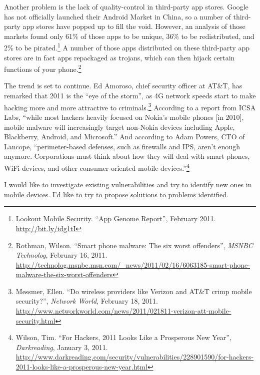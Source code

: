 \documentclass[11pt]{article}
\begin{document}
Another problem is the lack of quality-control in third-party app stores. Google has not officially launched their Android Market in China, so a number of third-party app stores have popped up to fill the void. However, an analysis of those markets found only 61\% of those apps to be unique, 36\% to be redistributed, and 2\% to be pirated.\footnote{Lookout Mobile Security. ``App Genome Report'', February 2011. \url{http://bit.ly/idg1tI}} A number of those apps distributed on these third-party app stores are in fact apps repackaged as trojans, which can then hijack certain functions of your phone.\footnote{Rothman, Wilson. ``Smart phone malware: The six worst offenders'', \textit{MSNBC Technolog}, 
February 16, 2011. \url{http://technolog.msnbc.msn.com/_news/2011/02/16/6063185-smart-phone-malware-the-six-worst-offenders}}

The trend is set to continue. Ed Amoroso, chief security officer at AT\&T, has remarked that 2011 is the ``eye of the storm'', as 4G network speeds start to make hacking more and more attractive to criminals.\footnote{Messmer, Ellen. ``Do wireless providers like Verizon and AT\&T crimp mobile security?'', \textit{Network World}, February 18, 2011. \url{http://www.networkworld.com/news/2011/021811-verizon-att-mobile-security.html}} According to a report from ICSA Labs, ``while most hackers heavily focused on Nokia's mobile phones [in 2010], mobile malware will increasingly target non-Nokia devices including Apple, Blackberry, Android, and Microsoft.'' And according to Adam Powers, CTO of Lancope, ``perimeter-based defenses, such as firewalls and IPS, aren't enough anymore. Corporations must think about how they will deal with smart phones, WiFi devices, and other consumer-oriented mobile devices.''\footnote{Wilson, Tim. ``For Hackers, 2011 Looks Like a Prosperous New Year'', \textit{Darkreading}, January 3, 2011. \url{http://www.darkreading.com/security/vulnerabilities/228901590/for-hackers-2011-looks-like-a-prosperous-new-year.html}}

I would like to investigate existing vulnerabilities and try to identify new ones in mobile devices. I'd like to try to propose solutions to problems identified.
\end{document}
